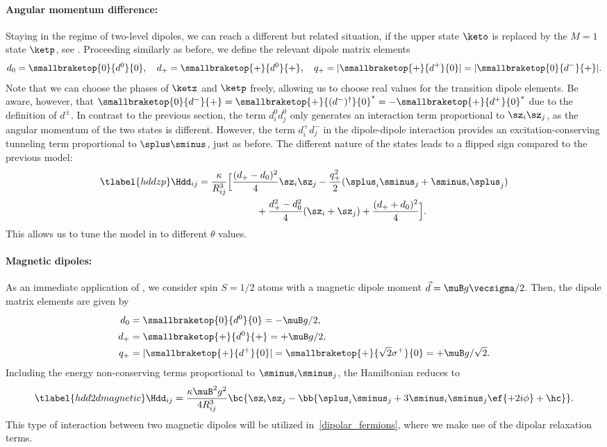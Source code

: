 \paragraph{Angular momentum difference:}
Staying in the regime of two-level dipoles, we can reach a different but related situation, if the upper state $\keto$ is replaced by the $M=1$ state $\ketp$, see .
Proceeding similarly as before, we define the relevant dipole matrix elements
\begin{align}
    d_0 = \smallbraketop{0}{d^0}{0},\quad
    d_+ = \smallbraketop{+}{d^0}{+},\quad
    q_+ = |\smallbraketop{+}{d^+}{0}| = |\smallbraketop{0}{d^-}{+}|.
\end{align}
Note that we can choose the phases of $\ketz$ and $\ketp$ freely, allowing us to choose real values for the transition dipole elements. Be aware, however, that $\smallbraketop{0}{d^-}{+} = \smallbraketop{+}{(d^-)^\dag}{0}^* = -\smallbraketop{+}{d^+}{0}^*$ due to the definition of $d^\pm$.
In contrast to the previous section, the term $d^0_i d^0_j$ only generates an interaction term proportional to $\sz_i \sz_j$, as the angular momentum of the two states is different. However, the term $d^+_i d^-_j$ in the dipole-dipole interaction provides an excitation-conserving tunneling term proportional to $\splus\sminus$, just as before. The different nature of the states leads to a flipped sign compared to the previous model:
\begin{align} \tlabel{hddzp}
    \Hdd_{ij} &= \frac{\kappa}{R_{ij}^3} \Big[ \frac{(d_+-d_0)^2}{4} \sz_i \sz_j  - \frac{q_+^2}{2} (\splus_i \sminus_j + \sminus_i \splus_j) \\
              &\qquad\qquad\qquad + \frac{d_+^2 - d_0^2}{4} (\sz_i + \sz_j)  + \frac{(d_++d_0)^2}{4} \Big].
\end{align}
This allows us to tune the model in  to different $\theta$ values.

\paragraph{Magnetic dipoles:}
As an immediate application of , we consider spin $S=1/2$ atoms with a
magnetic dipole moment $\vec{d}=\muB g \vecsigma / 2$.
Then, the dipole matrix elements are given by
\begin{align}
    d_0 &= \smallbraketop{0}{d^0}{0} = -\muB g/2, \vphantom{\sqrt{2}} \\
    d_+ &= \smallbraketop{+}{d^0}{+} = +\muB g/2, \vphantom{\sqrt{2}} \\
    q_+ &= |\smallbraketop{+}{d^+}{0}| = \smallbraketop{+}{\sqrt{2} \sigma^+}{0} = +\muB g/\sqrt{2}.
\end{align}
Including the energy non-conserving terms proportional to $\sminus_i\sminus_j$, the Hamiltonian reduces to
\begin{align} \tlabel{hdd2dmagnetic}
    \Hdd_{ij} = \frac{\kappa \muB^2 g^2}{4 R_{ij}^3} \bc{ \sz_i \sz_j - \bb{\splus_i \sminus_j+ 3 \sminus_i\sminus_j \ef{+2i\phi} + \hc } }.
\end{align}
This type of interaction between two magnetic dipoles will be utilized in~\cref{dipolar_fermions}, where we make use of the dipolar relaxation terms.


